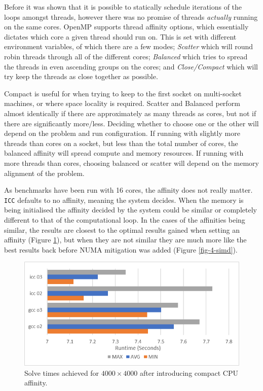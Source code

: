 \documentclass[11pt,twocolumn,a4paper]{article}
\begin{document}
Before it was shown that it is possible to statically schedule iterations of the loops amongst threads, however there was no promise of threads \textit{actually} running on the same cores. OpenMP supports thread affinity options, which essentially dictates which core a given thread should run on. This is set with different environment variables, of which there are a few modes; \textit{Scatter} which will round robin threads through all of the different cores; \textit{Balanced} which tries to spread the threads in even ascending groups on the cores; and \textit{Close/Compact} which will try keep the threads as close together as possible. \par

Compact is useful for when trying to keep to the first socket on multi-socket machines, or where space locality is required. Scatter and Balanced perform almost identically if there are approximately as many threads as cores, but not if there are significantly more/less. Deciding whether to choose one or the other will depend on the problem and run configuration. If running with slightly more threads than cores on a socket, but less than the total number of cores, the balanced affinity will spread compute and memory resources. If running with more threads than cores, choosing balanced or scatter will depend on the memory alignment of the problem. \par

As benchmarks have been run with 16 cores, the affinity does not really matter. \texttt{ICC} defaults to no affinity, meaning the system decides. When the memory is being initialised the affinity decided by the system could be similar or completely different to that of the computational loop. In the cases of the affinities being similar, the results are closest to the optimal results gained when setting an affinity (Figure \ref{fig-6-affin}), but when they are not similar they are much more like the best results back  before NUMA mitigation was added (Figure \ref{fig-4-simd}). \par

\begin{figure}[h]
        \centering
        \includegraphics[width=0.8\linewidth]{figures/7-CPU-AFFIN.png}
        \caption{Solve times achieved for $4000\times4000$ after introducing compact CPU affinity.}
        \label{fig-6-affin}
\end{figure}
\end{document}
